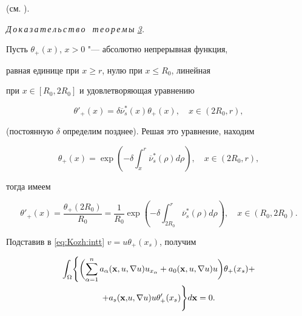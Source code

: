 (см. \cite [неравенство (57)]{KozhKhad:bib:Andrianova}).



\smallskip



{\it Д\,о\,к\,а\,з\,а\,т\,е\,л\,ь\,с\,т\,в\,о \ т\,е\,о\,р\,е\,м\,ы \rm \hyperlink{kozh:th3}{3}.}

Пусть $\theta_+(x)$, $x>0$ "--- абсолютно непрерывная функция,

равная единице при $x\ge r$, нулю при $x\le R_0$, линейная

при $x\in[R_0, 2R_0]$ и удовлетворяющая уравнению

\begin{equation}\label{eq:Kozh:the_4(0)}

\theta'_+(x)=\delta \overline{\nu}_s^*(x)\theta_+(x),\quad

x\in(2R_0,r),

\end{equation}

 (постоянную $\delta$ определим позднее).   Решая это уравнение, находим

 $$

\theta_+(x)=\exp\left(-\delta \int_{x}^r

\overline{\nu}_s^*(\rho)d\rho\right),\quad x\in(2R_0,r),

$$

 тогда имеем

\begin{equation}

\theta'_+(x)=\frac{\theta_+(2R_0)}{R_0}=\frac{1}{R_0}\exp\left(-\delta

\int_{2R_0}^r \overline{\nu}_s^*(\rho)d\rho\right),\quad

x\in(R_0,2R_0).\label{eq:Kozh:the_4(1)}

\end{equation}



Подставив в \eqref{eq:Kozh:intt} $v =u\theta_+(x_s)$, получим

\begin{multline*}

  \int_{\Omega}\Biggl\{\biggl(\sum\limits_{\alpha=1}^{n}a_{\alpha}({\bf

x},u,\nabla u)u_{x_{\alpha}}+a_0({\bf

x}, u,\nabla u)u\biggr)\theta_+(x_s)+ \\

+ a_{s}({\bf x,}u,\nabla u)u\theta'_+(x_s)\Biggr\}d{\bf x}=0.

\end{multline*}



